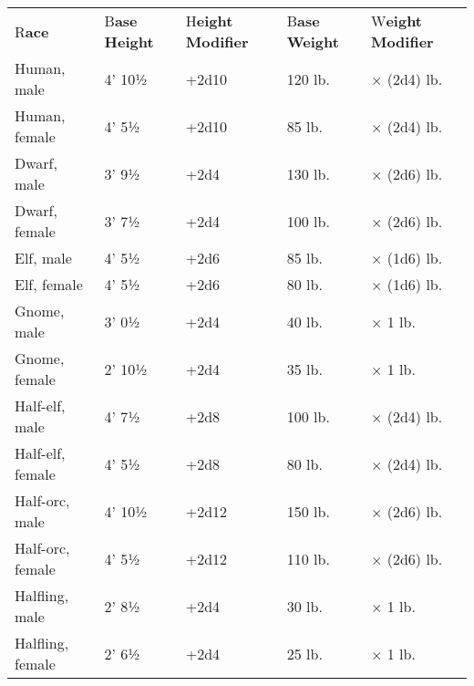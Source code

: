 \documentclass{article}
\begin{document}
\vspace{12pt}
\begin{tabular}{|>{\raggedright}p{61pt}|>{\raggedright}p{47pt}|>{\raggedright}p{64pt}|>{\raggedright}p{49pt}|>{\raggedright}p{66pt}|}
\hline
\multicolumn{5}{|p{290pt}|}{T\textbf{able: Random Height and Weight}}\tabularnewline
\hline
R\textbf{ace} & B\textbf{ase Height} & H\textbf{eight Modifier} & B\textbf{ase 
Weight} & W\textbf{eight Modifier}\tabularnewline
\hline
Human, male & 4' 10½ & +2d10 & 120 lb. & \ensuremath{\times} (2d4) lb.\tabularnewline
\hline
Human, female & 4' 5½ & +2d10 & 85 lb. & \ensuremath{\times} (2d4) lb.\tabularnewline
\hline
Dwarf, male & 3' 9½ & +2d4 & 130 lb. & \ensuremath{\times} (2d6) lb.\tabularnewline
\hline
Dwarf, female & 3' 7½ & +2d4 & 100 lb. & \ensuremath{\times} (2d6) lb.\tabularnewline
\hline
Elf, male & 4' 5½ & +2d6 & 85 lb. & \ensuremath{\times} (1d6) lb.\tabularnewline
\hline
Elf, female & 4' 5½ & +2d6 & 80 lb. & \ensuremath{\times} (1d6) lb.\tabularnewline
\hline
Gnome, male & 3' 0½ & +2d4 & 40 lb. & \ensuremath{\times} 1 lb.\tabularnewline
\hline
Gnome, female & 2' 10½ & +2d4 & 35 lb. & \ensuremath{\times} 1 lb.\tabularnewline
\hline
Half-elf, male & 4' 7½ & +2d8 & 100 lb. & \ensuremath{\times} (2d4) lb.\tabularnewline
\hline
Half-elf, female & 4' 5½ & +2d8 & 80 lb. & \ensuremath{\times} (2d4) lb.\tabularnewline
\hline
Half-orc, male & 4' 10½ & +2d12 & 150 lb. & \ensuremath{\times} (2d6) lb.\tabularnewline
\hline
Half-orc, female & 4' 5½ & +2d12 & 110 lb. & \ensuremath{\times} (2d6) lb.\tabularnewline
\hline
Halfling, male & 2' 8½ & +2d4 & 30 lb. & \ensuremath{\times} 1 lb.\tabularnewline
\hline
Halfling, female & 2' 6½ & +2d4 & 25 lb. & \ensuremath{\times} 1 lb.\tabularnewline
\hline
\end{tabular}

\newpage
\end{document}
